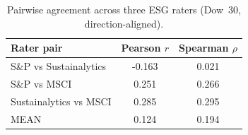 \begin{table}[t]
  \centering
  \caption{Pairwise agreement across three ESG raters (Dow~30, direction-aligned).}
  \label{tab:corr}
  \begin{tabular}{@{}lS[table-format=-1.3]S[table-format=-1.3]@{}}
    \toprule
    Rater pair & {Pearson $r$} & {Spearman $\rho$} \\
    \midrule
    S\&P vs Sustainalytics & -0.163 & 0.021 \\
    S\&P vs MSCI & 0.251 & 0.266 \\
    Sustainalytics vs MSCI & 0.285 & 0.295 \\
    \midrule
    MEAN & 0.124 & 0.194 \\
    \bottomrule
  \end{tabular}
\end{table}
